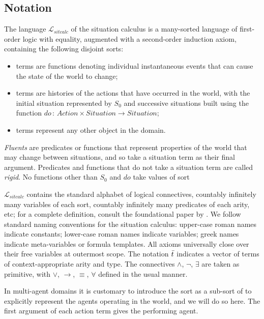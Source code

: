 \subsection{Notation\label{sec:Background:SC:Notation}}

The language $\mathcal{L}_{sitcalc}$ of the situation calculus is
a many-sorted language of first-order logic with equality, augmented
with a second-order induction axiom, containing the following disjoint
sorts:

\begin{itemize}
\item \emph{} terms are functions denoting individual instantaneous
events that can cause the state of the world to change; 
\item {} terms are histories of the actions that have occurred
in the world, with the initial situation represented by $S_{0}$ and
successive situations built using the function $do\,:\, Action\times Situation\rightarrow Situation$; 
\item {} terms represent any other object in the domain. 
\end{itemize}
\emph{Fluents} are predicates or functions that represent properties
of the world that may change between situations, and so take a situation
term as their final argument. Predicates and functions that do not
take a situation term are called \emph{rigid}. No functions other
than $S_{0}$ and $do$ take values of sort 

$\mathcal{L}_{sitcalc}$ contains the standard alphabet of logical
connectives, countably infinitely many variables of each sort, countably
infinitely many predicates of each arity, etc; for a complete definition,
consult the foundational paper by \citet{pirri99contributions_sitcalc}.
We follow standard naming conventions for the situation calculus:
upper-case roman names indicate constants; lower-case roman names
indicate variables; greek names indicate meta-variables or formula
templates. All axioms universally close over their free variables
at outermost scope. The notation $\bar{t}$ indicates a vector of
terms of context-appropriate arity and type. The connectives $\wedge$,
$\neg$, $\exists$ are taken as primitive, with $\vee$, $\rightarrow$,
$\equiv$, $\forall$ defined in the usual manner.

In multi-agent domains it is customary to introduce the sort as a sub-sort of  to explicitly represent the agents
operating in the world, and we will do so here. The first argument
of each action term gives the performing agent.


